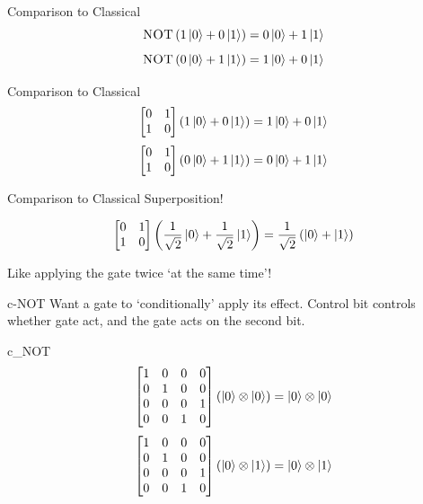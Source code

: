 \documentclass{beamer}
\begin{document}
\begin{frame}{Comparison to Classical}
    $$ \textsc{NOT}\left(1\ket{0}+0\ket{1}\right) = 0\ket{0}+1\ket{1}$$
    $$ \textsc{NOT}\left(0\ket{0}+1\ket{1}\right) = 1\ket{0}+0\ket{1}$$
\end{frame}
\begin{frame}{Comparison to Classical}
    $$ \begin{bmatrix}
        0 & 1 \\
        1 & 0
    \end{bmatrix} \left(1\ket{0}+0\ket{1}\right) = 1\ket{0}+0\ket{1}$$
    $$ \begin{bmatrix}
        0 & 1 \\
        1 & 0
    \end{bmatrix}\left(0\ket{0}+1\ket{1}\right) = 0\ket{0}+1\ket{1}$$
\end{frame}
\begin{frame}{Comparison to Classical}
    Superposition!
    
    $$ \begin{bmatrix}
        0 & 1 \\
        1 & 0
    \end{bmatrix}\left(\frac{1}{\sqrt{2}}\ket{0}+\frac{1}{\sqrt{2}}\ket{1}\right) = \frac{1}{\sqrt{2}}\left(\ket{0}+\ket{1}\right)$$
    
    Like applying the gate twice `at the same time'!
\end{frame}
\begin{frame}{c-NOT}
    Want a gate to `conditionally' apply its effect. Control bit controls whether gate act, and the gate acts on the second bit.
\end{frame}
\begin{frame}{c_NOT}
$$\begin{bmatrix}
   1 & 0 & 0 & 0\\
   0 & 1 & 0 & 0\\
   0 & 0 & 0 & 1\\
   0 & 0 & 1 & 0
   \end{bmatrix}(\ket{0} \otimes \ket{0}) = \ket{0} \otimes \ket{0}$$
   $$\begin{bmatrix}
   1 & 0 & 0 & 0\\
   0 & 1 & 0 & 0\\
   0 & 0 & 0 & 1\\
   0 & 0 & 1 & 0
   \end{bmatrix}(\ket{0} \otimes \ket{1}) = \ket{0} \otimes \ket{1}$$
\end{frame}
\end{document}
